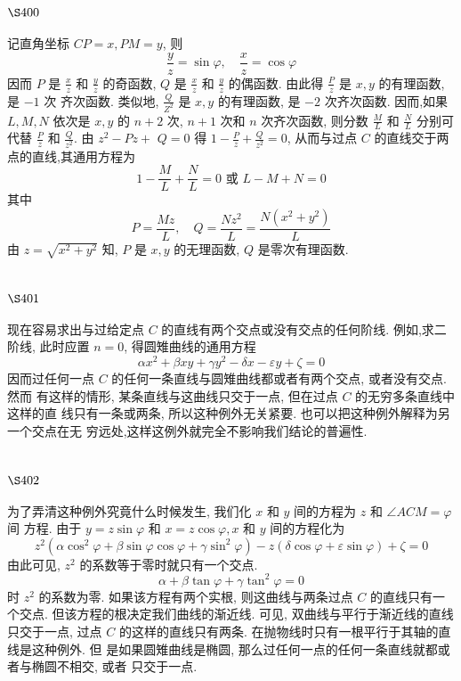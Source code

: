 \section{$\S 400$}

记直角坐标 $C P=x, P M=y$, 则
\[
\frac{y}{z}=\sin \varphi, \quad \frac{x}{z}=\cos \varphi
\]
因而 $P$ 是 $\frac{x}{z}$ 和 $\frac{y}{z}$ 的奇函数, $Q$ 是 $\frac{x}{z}$ 和 $\frac{y}{z}$ 的偶函数. 由此得 $\frac{P}{z}$ 是 $x, y$ 的有理函数, 是 $-1$ 次 齐次函数. 类似地, $\frac{Q}{Z^{2}}$ 是 $x, y$ 的有理函数, 是 $-2$ 次齐次函数. 因而,如果 $L, M, N$ 依次是 $x, y$ 的 $n+2$ 次, $n+1$ 次和 $n$ 次齐次函数, 则分数 $\frac{M}{L}$ 和 $\frac{N}{L}$ 分别可代替 $\frac{P}{z}$ 和 $\frac{Q}{z^{2}}$. 由 $z^{2}-P z+$ $Q=0$ 得 $1-\frac{P}{z}+\frac{Q}{z^{2}}=0$, 从而与过点 $C$ 的直线交于两点的直线,其通用方程为
\[
1-\frac{M}{L}+\frac{N}{L}=0 \text { 或 } L-M+N=0
\]
其中
\[
P=\frac{M z}{L}, \quad Q=\frac{N z^{2}}{L}=\frac{N\left(x^{2}+y^{2}\right)}{L}
\]
由 $z=\sqrt{x^{2}+y^{2}}$ 知, $P$ 是 $x, y$ 的无理函数, $Q$ 是零次有理函数.

\section{$\S 401$}

现在容易求出与过给定点 $C$ 的直线有两个交点或没有交点的任何阶线. 例如,求二 阶线, 此时应置 $n=0$, 得圆雉曲线的通用方程
\[
\alpha x^{2}+\beta x y+\gamma y^{2}-\delta x-\varepsilon y+\zeta=0
\]
因而过任何一点 $C$ 的任何一条直线与圆雉曲线都或者有两个交点, 或者没有交点. 然而 有这样的情形, 某条直线与这曲线只交于一点, 但在过点 $C$ 的无穷多条直线中这样的直 线只有一条或两条, 所以这种例外无关紧要. 也可以把这种例外解释为另一个交点在无 穷远处,这样这例外就完全不影响我们结论的普遍性.

\section{$\S 402$}

为了弄清这种例外究竟什么时候发生, 我们化 $x$ 和 $y$ 间的方程为 $z$ 和 $\angle A C M=\varphi$ 间 方程. 由于 $y=z \sin \varphi$ 和 $x=z \cos \varphi, x$ 和 $y$ 间的方程化为
\[
z^{2}\left(\alpha \cos ^{2} \varphi+\beta \sin \varphi \cos \varphi+\gamma \sin ^{2} \varphi\right)-z(\delta \cos \varphi+\varepsilon \sin \varphi)+\zeta=0
\]
由此可见, $z^{2}$ 的系数等于零时就只有一个交点.
\[
\alpha+\beta \tan \varphi+\gamma \tan ^{2} \varphi=0
\]
时 $z^{2}$ 的系数为零. 如果该方程有两个实根, 则这曲线与两条过点 $C$ 的直线只有一个交点. 但该方程的根决定我们曲线的渐近线. 可见, 双曲线与平行于渐近线的直线只交于一点, 过点 $C$ 的这样的直线只有两条. 在抛物线时只有一根平行于其轴的直线是这种例外. 但 是如果圆雉曲线是椭圆, 那么过任何一点的任何一条直线就都或者与椭圆不相交, 或者 只交于一点.

